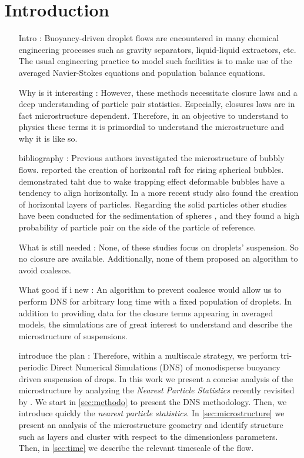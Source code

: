 \section{Introduction}



\begin{enumerate}
    \item[Intro : ]
    Buoyancy-driven droplet flows are encountered in many chemical engineering processes such as gravity separators, liquid-liquid extractors, etc. The usual engineering practice to model such facilities is to make use of the averaged Navier-Stokes equations and population balance equations. 
    \item[Why is it interesting :]
    However, these methods necessitate closure laws and a deep understanding of particle pair statistics.
    Especially, closures laws are in fact microstructure dependent. 
    Therefore, in an objective to understand to physics these terms it is primordial to understand the microstructure and why it is like so. 
    \item[bibliography : ]
    Previous authors investigated the microstructure of bubbly flows. 
    \citet{bunner2002dynamics} reported the creation of horizontal raft for rising  spherical bubbles. 
    \citet{bunner2003effect} demonstrated taht due to wake trapping effect deformable bubbles have a tendency to align horizontally. 
    In a more recent study \citet{zhang2021direct} also found the creation of horizontal layers of particles. 
    Regarding the solid particles other studies have been conducted for the sedimentation of spheres \citet{shajahan2023inertial}, and they found a high probability of particle pair on  the side of the particle of reference.     
    \item[What is still needed :]
    None, of these studies focus on droplets' suspension. 
    So no closure are available. 
    Additionally, none of them proposed an algorithm to avoid coalesce. 
    \item[What good if i new :]
    An algorithm to prevent coalesce would allow us to perform DNS for arbitrary long time with a fixed population of droplets. 
    In addition to providing data for the closure terms appearing in averaged models, the simulations are of great interest to understand and describe the microstructure of suspensions. 
    \item[introduce the plan :]
    Therefore, within a multiscale strategy, we perform tri-periodic Direct Numerical Simulations (DNS) of monodisperse buoyancy driven suspension of drops.
    In this work we present a concise analysis of the microstructure by analyzing the \textit{Nearest Particle Statistics} recently revisited by \citet{zhang2021ensemble}. 
    We start in \ref{sec:methodo} to present the DNS methodology. 
    Then, we introduce quickly the \textit{nearest particle statistics}.
    In \ref{sec:microstructure} we present an analysis of the microstructure geometry and identify structure such as layers and cluster with respect to the dimensionless parameters. 
    Then, in \ref{sec:time} we describe the relevant timescale of the flow. 

\end{enumerate}